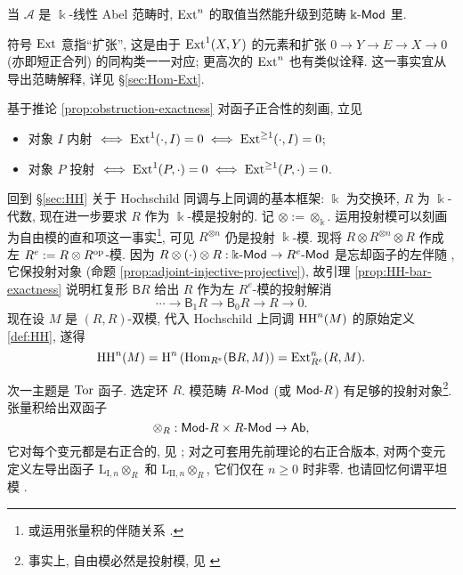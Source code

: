 当 $\mathcal{A}$ 是 $\Bbbk$-线性 Abel 范畴时, $\operatorname{Ext}^n$ 的取值当然能升级到范畴 $\Bbbk\text{-}\mathsf{Mod}$ 里.

\begin{remark}
	符号 $\operatorname{Ext}$ 意指``扩张'', 这是由于 $\operatorname{Ext}^1(X, Y)$ 的元素和扩张 $0 \to Y \to E \to X \to 0$ (亦即短正合列) 的同构类一一对应; 更高次的 $\operatorname{Ext}^n$ 也有类似诠释. 这一事实宜从导出范畴解释, 详见 \S\ref{sec:Hom-Ext}.
\end{remark}

基于推论 \ref{prop:obstruction-exactness} 对函子正合性的刻画, 立见
\begin{itemize}
	\item 对象 $I$ 内射 $\iff \operatorname{Ext}^1(\cdot, I) = 0 \iff \operatorname{Ext}^{\geq 1}(\cdot, I) = 0$;
	\item 对象 $P$ 投射 $\iff \operatorname{Ext}^1(P, \cdot) = 0 \iff \operatorname{Ext}^{\geq 1}(P, \cdot) = 0$.
\end{itemize}

\begin{example}\label{eg:HH-Ext}
	回到 \S\ref{sec:HH} 关于 Hochschild 同调与上同调的基本框架: $\Bbbk$ 为交换环, $R$ 为 $\Bbbk$-代数, 现在进一步要求 $R$ 作为 $\Bbbk$-模是投射的. 记 $\otimes := \otimes_{\Bbbk}$. 运用投射模可以刻画为自由模的直和项这一事实\footnote{或运用张量积的伴随关系 \cite[定理 6.6.5]{Li1}.}, 可见 $R^{\otimes n}$ 仍是投射 $\Bbbk$-模. 现将 $R \otimes R^{\otimes n} \otimes R$ 作成左 $R^e := R \otimes R^{\operatorname{op}}$-模. 因为 $R \otimes (\cdot) \otimes R: \Bbbk\text{-}\mathsf{Mod} \to R^e\text{-}\mathsf{Mod}$ 是忘却函子的左伴随 \cite[推论 6.6.8]{Li1}, 它保投射对象 (命题 \ref{prop:adjoint-injective-projective}), 故引理 \ref{prop:HH-bar-exactness} 说明杠复形 $\mathsf{B}R$ 给出 $R$ 作为左 $R^e$-模的投射解消
	\begin{equation}\label{eqn:bar-proj-resolution}
		\cdots \to \mathsf{B}_1 R \to \mathsf{B}_0 R \to R \to 0.
	\end{equation}
	现在设 $M$ 是 $(R,R)$-双模, 代入 Hochschild 上同调 $\operatorname{HH}^n(M)$ 的原始定义 \ref{def:HH}, 遂得
	\[ \operatorname{HH}^n(M) = \operatorname{H}^n\left( \operatorname{Hom}_{R^e}(\mathsf{B} R, M) \right) = \operatorname{Ext}^n_{R^e}(R, M). \]
\end{example}

次一主题是 $\operatorname{Tor}$ 函子. 选定环 $R$. 模范畴 $R\text{-}\mathsf{Mod}$ (或 $\mathsf{Mod}\text{-}R$) 有足够的投射对象\footnote{事实上, 自由模必然是投射模, 见 \cite[例 6.9.6]{Li1}}. 张量积给出双函子
\[ \otimes_R: \mathsf{Mod}\text{-}R \times R\text{-}\mathsf{Mod} \to \mathsf{Ab}, \]
它对每个变元都是右正合的, 见 \cite[命题 6.9.2]{Li1}; 对之可套用先前理论的右正合版本, 对两个变元定义左导出函子 $\mathrm{L}_{\mathrm{I}, n} \otimes_R$ 和 $\mathrm{L}_{\mathrm{II}, n} \otimes_R$, 它们仅在 $n \geq 0$ 时非零. 也请回忆何谓平坦模 \cite[定义 6.9.4]{Li1}.

